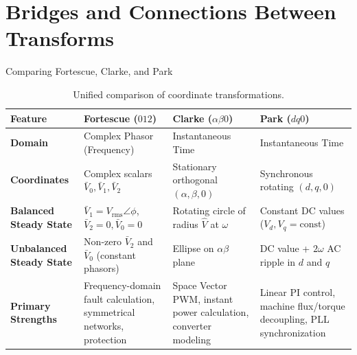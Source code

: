 \section{Bridges and Connections Between Transforms}

\begin{frame}[shrink=10]{Comparing Fortescue, Clarke, and Park}
    \begin{table}
        \centering
        \scriptsize
        \begin{tabularx}{\textwidth}{l p{2.8cm} p{3.0cm} X}
            \toprule
            \textbf{Feature} & \textbf{Fortescue ($012$)} & \textbf{Clarke ($\alpha\beta0$)} & \textbf{Park ($dq0$)} \\
            \midrule
            \textbf{Domain} & Complex Phasor (Frequency) & Instantaneous Time & Instantaneous Time \\
            \addlinespace
            \textbf{Coordinates} & Complex scalars $\bar{V}_0, \bar{V}_1, \bar{V}_2$ & Stationary orthogonal $(\alpha, \beta, 0)$ & Synchronous rotating $(d, q, 0)$ \\
            \addlinespace
            \textbf{Balanced Steady State} & $\bar{V}_1 = V_{\text{rms}} \angle \phi$, $\bar{V}_2 = 0, \bar{V}_0 = 0$ & Rotating circle of radius $\hat{V}$ at $\omega$ & Constant DC values ($V_d, V_q = \text{const}$) \\
            \addlinespace
            \textbf{Unbalanced Steady State} & Non-zero $\bar{V}_2$ and $\bar{V}_0$ (constant phasors) & Ellipse on $\alpha\beta$ plane & DC value + $2\omega$ AC ripple in $d$ and $q$ \\
            \addlinespace
            \textbf{Primary Strengths} & Frequency-domain fault calculation, symmetrical networks, protection & Space Vector PWM, instant power calculation, converter modeling & Linear PI control, machine flux/torque decoupling, PLL synchronization \\
            \bottomrule
        \end{tabularx}
        \caption{Unified comparison of coordinate transformations.}
    \end{table}
\end{frame}

